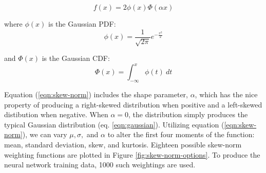 \begin{equation}
	\label{eqn:skew-norm}
	f(x)=2\phi (x)\Phi (\alpha x)
\end{equation}
 
\noindent
where $ \phi(x) $ is the Gaussian PDF:
\begin{equation}
	\label{eqn:skew-norm-pdf}
	\phi (x)={\frac  {1}{{\sqrt  {2\pi }}}}e^{{-{\frac  {x^{2}}{2}}}}
\end{equation}

\noindent
and $ \Phi (x) $ is the Gaussian CDF:
\begin{equation}
	\label{eqn:skew-norm-cdf}
	\Phi (x)=\int _{{-\infty }}^{{x}}\phi (t)\ dt
\end{equation}



\noindent
Equation (\ref{eqn:skew-norm}) includes the shape parameter, $ \alpha $, which has the nice property of producing a right-skewed distribution when positive and a left-skewed distibution when negative. When $ \alpha=0 $, the distribution simply produces the typical Gaussian distribution (eq. \ref{eqn:gaussian}). Utilizing equation (\ref{eqn:skew-norm}), we can vary $ \mu, \sigma,  $ and $ \alpha $ to alter the first four moments of the function: mean, standard deviation, skew, and kurtosis. Eighteen possible skew-norm weighting functions are plotted in Figure \ref{fig:skew-norm-options}. To produce the neural network training data, 1000 such weightings are used.

